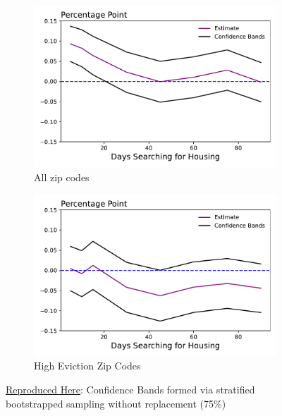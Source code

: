\documentclass[a4paper,12pt]{article}
\begin{document}
\begin{figure}[htbp]
\centering
\begin{subfigure}{.48\textwidth}
    \centering
    \includegraphics[width=.95\linewidth]{figures/rtc/results/cceh/diff_in_mean_False.pdf}
    \caption{All zip codes}
    \label{SUBFIGURE LABEL 3}
\end{subfigure}
\begin{subfigure}{.48\textwidth}
    \centering
    \includegraphics[width=.95\linewidth]{figures/rtc/results/cceh/diff_in_mean_True.pdf}
    \caption{High Eviction Zip Codes}
    \label{SUBFIGURE LABEL 4}
\end{subfigure}
\caption{ \href{https://github.com/pharringtonp19/evictions/blob/main/scripts/cceh/primary/diff_n_mean_rrh.py}{Reproduced Here}: Confidence Bands formed via stratified bootstrapped sampling without replacement (75\%)}
\label{FIGURE LABEL}
\end{figure}
\end{document}
